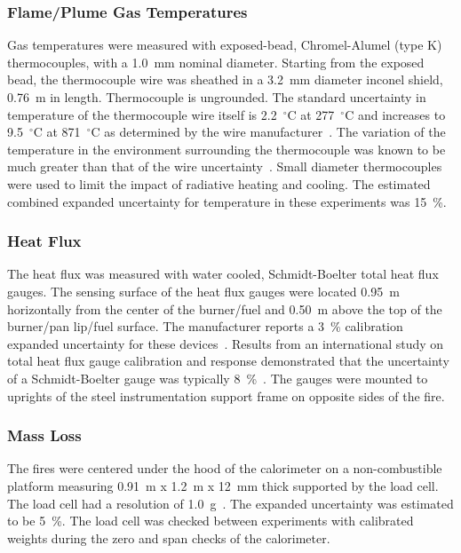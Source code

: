 \documentclass[twoside]{uocthesis}
\begin{document}
{\subsubsection{Flame/Plume Gas Temperatures}

Gas temperatures were measured with exposed-bead, Chromel-Alumel (type K) thermocouples, with a 1.0~mm nominal diameter.  Starting from the exposed bead, the thermocouple wire was sheathed in a 3.2~mm diameter inconel shield, 0.76~m in length. Thermocouple is ungrounded. The standard uncertainty in temperature of the thermocouple wire itself is 2.2~$^\circ$C at 277~$^\circ$C and increases to 9.5~$^\circ$C at 871~$^\circ$C as determined by the wire manufacturer~\cite{Omega}.  The variation of the temperature in the environment surrounding the thermocouple was known to be much greater than that of the wire uncertainty~\cite{Blevins:1999,Pitts:2001}. Small diameter thermocouples were used to limit the impact of radiative heating and cooling.  The estimated combined expanded uncertainty for temperature in these experiments was 15~\%.

\subsubsection{Heat Flux}

The heat flux was measured with water cooled, Schmidt-Boelter total heat flux gauges. The sensing surface of the heat flux gauges were located 0.95~m horizontally from the center of the burner/fuel and 0.50~m above the top of the burner/pan lip/fuel surface.  The manufacturer reports a 3~\% calibration expanded uncertainty for these devices~\cite{Medtherm}. Results from an international study on total heat flux gauge calibration and response demonstrated that the uncertainty of a Schmidt-Boelter gauge was typically 8~\%~\cite{Pitts:2006}.  The gauges were mounted to uprights of the steel instrumentation support frame on opposite sides of the fire.

\subsubsection{Mass Loss}

The fires were centered under the hood of the calorimeter on a non-combustible platform measuring 0.91~m x 1.2~m x 12~mm thick supported by the load cell.  The load cell had a resolution of 1.0~g~\cite{Mettler}. The expanded uncertainty was estimated to be 5~\%.  The load cell was checked between experiments with calibrated weights during the zero and span checks of the calorimeter.

}
\end{document}
